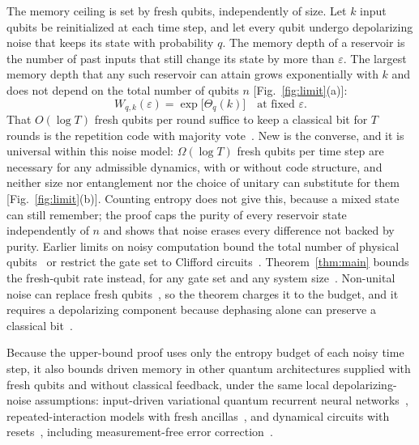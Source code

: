\documentclass[aps,prl,twocolumn,superscriptaddress,floatfix]{revtex4-2}
\theoremstyle{plain}
\begin{document}
The memory ceiling is set by fresh qubits, independently of size. Let $k$ input qubits be reinitialized at each time step, and let every qubit undergo depolarizing noise that keeps its state with probability $q$. The memory depth of a reservoir is the number of past inputs that still change its state by more than $\varepsilon$. The largest memory depth that any such reservoir can attain grows exponentially with $k$ and does not depend on the total number of qubits $n$ [Fig.~\ref{fig:limit}(a)]:
\begin{equation}
W_{q,k}(\varepsilon)=\exp\!\big[\Theta_q(k)\big]\quad\text{at fixed }\varepsilon.
\label{eq:main}
\end{equation}
That $O(\log T)$ fresh qubits per round suffice to keep a classical bit for $T$ rounds is the repetition code with majority vote~\cite{vonNeumann1956}. New is the converse, and it is universal within this noise model: $\Omega(\log T)$ fresh qubits per time step are necessary for any admissible dynamics, with or without code structure, and neither size nor entanglement nor the choice of unitary can substitute for them [Fig.~\ref{fig:limit}(b)]. Counting entropy does not give this, because a mixed state can still remember; the proof caps the purity of every reservoir state independently of $n$ and shows that noise erases every difference not backed by purity. Earlier limits on noisy computation bound the total number of physical qubits~\cite{Fawzi2022} or restrict the gate set to Clifford circuits~\cite{Nelson2026}. Theorem~\ref{thm:main} bounds the fresh-qubit rate instead, for any gate set and any system size~\cite[Sec.~VIII\,B]{SM}. Non-unital noise can replace fresh qubits~\cite{BenOr2013}, so the theorem charges it to the budget, and it requires a depolarizing component because dephasing alone can preserve a classical bit~\cite{SM}.

Because the upper-bound proof uses only the entropy budget of each noisy time step, it also bounds driven memory in other quantum architectures supplied with fresh qubits and without classical feedback, under the same local depolarizing-noise assumptions: input-driven variational quantum recurrent neural networks~\cite{Takaki2021}, repeated-interaction models with fresh ancillas~\cite{Cattaneo2021}, and dynamical circuits with resets~\cite{Yasuda2023,Hu2024}, including measurement-free error correction~\cite{Heussen2024}.
\end{document}

